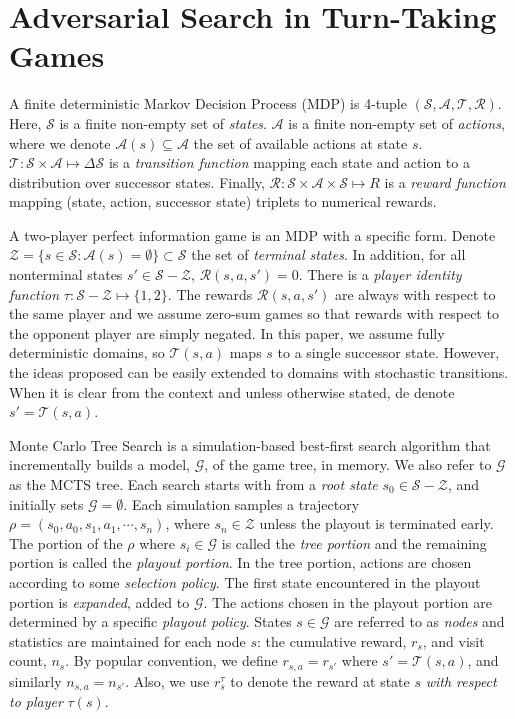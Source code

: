 \documentclass[letterpaper]{article}
\newcommand{\cA}{\mathcal{A}}
\newcommand{\cG}{\mathcal{G}}
\newcommand{\cR}{\mathcal{R}}
\newcommand{\cS}{\mathcal{S}}
\newcommand{\cT}{\mathcal{T}}
\newcommand{\cZ}{\mathcal{Z}}
\begin{document}

\section{Adversarial Search in Turn-Taking Games}


A finite deterministic Markov Decision Process (MDP) is 4-tuple $(\cS, \cA, \cT, \cR)$. Here, $\cS$ is a finite non-empty set of {\it states}. 
$\cA$ is a finite non-empty set of {\it actions}, where we denote $\cA(s) \subseteq \cA$ the set of available actions at state $s$. 
$\cT : \cS \times \cA \mapsto \Delta \cS$ is a {\it transition function} mapping 
each state and action to a distribution over successor states. Finally, $\cR : \cS \times \cA \times \cS \mapsto R$ 
is a {\it reward function} mapping (state, action, successor state) triplets to numerical rewards. 

A two-player perfect information game is an MDP with a specific form. 
Denote $\cZ = \{ s \in \cS: \cA(s) = \emptyset \} \subset \cS$ the set of {\it terminal states}. 
In addition, for all nonterminal states $s' \in \cS - \cZ$, $\cR(s,a,s') = 0$. 
There is a {\it player identity function} $\tau : \cS - \cZ \mapsto \{1,2\}$. 
The rewards $\cR(s,a,s')$ are always with respect to the same player and  
we assume zero-sum games so that rewards with respect to the opponent player are simply negated. 
In this paper, we assume fully deterministic domains, so $\cT(s,a)$ maps $s$ to a single successor 
state. 
However, the ideas proposed can be easily extended to domains with stochastic transitions. 
When it is clear from the context and unless otherwise stated, de denote $s' = \cT(s,a)$. 

Monte Carlo Tree Search is a simulation-based best-first search algorithm that incrementally builds a model, $\cG$, 
of the game tree, in memory. We also refer to $\cG$ as the MCTS tree. 
Each search starts with from a {\it root state} $s_0 \in \cS - \cZ$, and initially sets $\cG = \emptyset$. 
Each simulation samples a trajectory $\rho = (s_0, a_0, s_1, a_1, \cdots, s_n)$, where $s_n \in \cZ$ unless the playout 
is terminated early. 
The portion of the $\rho$ where $s_i \in \cG$ is called the {\it tree portion} and the remaining portion is
called the {\it playout portion}. In the tree portion, actions are chosen according to some {\it selection policy}. 
The first state encountered in the playout portion is {\it expanded}, added to $\cG$.
The actions chosen in the playout portion are determined by a specific {\it playout policy}. 
States $s \in \cG$ are referred to as {\it nodes} and statistics are  
maintained for each node $s$: the cumulative reward, $r_s$, and visit count, $n_s$. 
By popular convention, we define $r_{s,a} = r_{s'}$ where $s' = \cT(s,a)$, and similarly $n_{s,a} = n_{s'}$. 
Also, we use $r^{\tau}_s$ to denote the reward at state $s$ {\it with respect to player} $\tau(s)$. 
\end{document}
